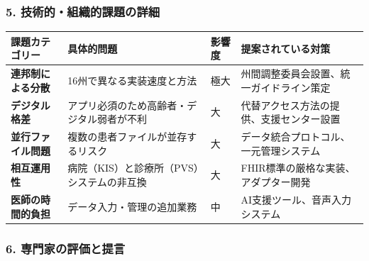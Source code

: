 \documentclass[
  a4paper,
  a4paper,
  11pt]{ltjsbook}
\begin{document}
\subsubsection{5.
技術的・組織的課題の詳細}\label{ux6280ux8853ux7684ux7d44ux7e54ux7684ux8ab2ux984cux306eux8a73ux7d30}

\begin{longtable}[]{@{}
  >{\raggedright\arraybackslash}p{}
  >{\raggedright\arraybackslash}p{}
  >{\raggedright\arraybackslash}p{}
  >{\raggedright\arraybackslash}p{}@{}}
\toprule\noalign{}
\begin{minipage}[b]{\linewidth}\raggedright
課題カテゴリー
\end{minipage} & \begin{minipage}[b]{\linewidth}\raggedright
具体的問題
\end{minipage} & \begin{minipage}[b]{\linewidth}\raggedright
影響度
\end{minipage} & \begin{minipage}[b]{\linewidth}\raggedright
提案されている対策
\end{minipage} \\
\midrule\noalign{}
\endhead
\bottomrule\noalign{}
\endlastfoot
\textbf{連邦制による分散} & 16州で異なる実装速度と方法 & 極大 &
州間調整委員会設置、統一ガイドライン策定 \\
\textbf{デジタル格差} & アプリ必須のため高齢者・デジタル弱者が不利 & 大
& 代替アクセス方法の提供、支援センター設置 \\
\textbf{並行ファイル問題} & 複数の患者ファイルが並存するリスク & 大 &
データ統合プロトコル、一元管理システム \\
\textbf{相互運用性} & 病院（KIS）と診療所（PVS）システムの非互換 & 大 &
FHIR標準の厳格な実装、アダプター開発 \\
\textbf{医師の時間的負担} & データ入力・管理の追加業務 & 中 &
AI支援ツール、音声入力システム \\
\end{longtable}

\subsubsection{6.
専門家の評価と提言}\label{ux5c02ux9580ux5bb6ux306eux8a55ux4fa1ux3068ux63d0ux8a00}
\end{document}
